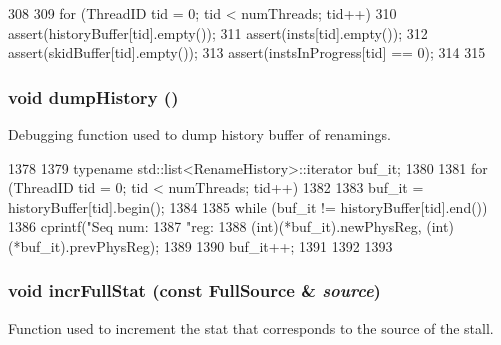 \begin{DoxyCode}
308 {
309     for (ThreadID tid = 0; tid < numThreads; tid++) {
310         assert(historyBuffer[tid].empty());
311         assert(insts[tid].empty());
312         assert(skidBuffer[tid].empty());
313         assert(instsInProgress[tid] == 0);
314     }
315 }
\end{DoxyCode}
\hypertarget{classDefaultRename_a697961c6f132b511d2921ed9feed80fa}{
\subsubsection[{dumpHistory}]{\setlength{\rightskip}{0pt plus 5cm}void dumpHistory ()}}
\label{classDefaultRename_a697961c6f132b511d2921ed9feed80fa}
Debugging function used to dump history buffer of renamings. 


\begin{DoxyCode}
1378 {
1379     typename std::list<RenameHistory>::iterator buf_it;
1380 
1381     for (ThreadID tid = 0; tid < numThreads; tid++) {
1382 
1383         buf_it = historyBuffer[tid].begin();
1384 
1385         while (buf_it != historyBuffer[tid].end()) {
1386             cprintf("Seq num: %
1387                     "reg: %
1388                     (int)(*buf_it).newPhysReg, (int)(*buf_it).prevPhysReg);
1389 
1390             buf_it++;
1391         }
1392     }
1393 }
\end{DoxyCode}
\hypertarget{classDefaultRename_a11c6015950a669c6a37e5d9bee62bbbf}{
\subsubsection[{incrFullStat}]{\setlength{\rightskip}{0pt plus 5cm}void incrFullStat (const {\bf FullSource} \& {\em source})}}
\label{classDefaultRename_a11c6015950a669c6a37e5d9bee62bbbf}
Function used to increment the stat that corresponds to the source of the stall. 


